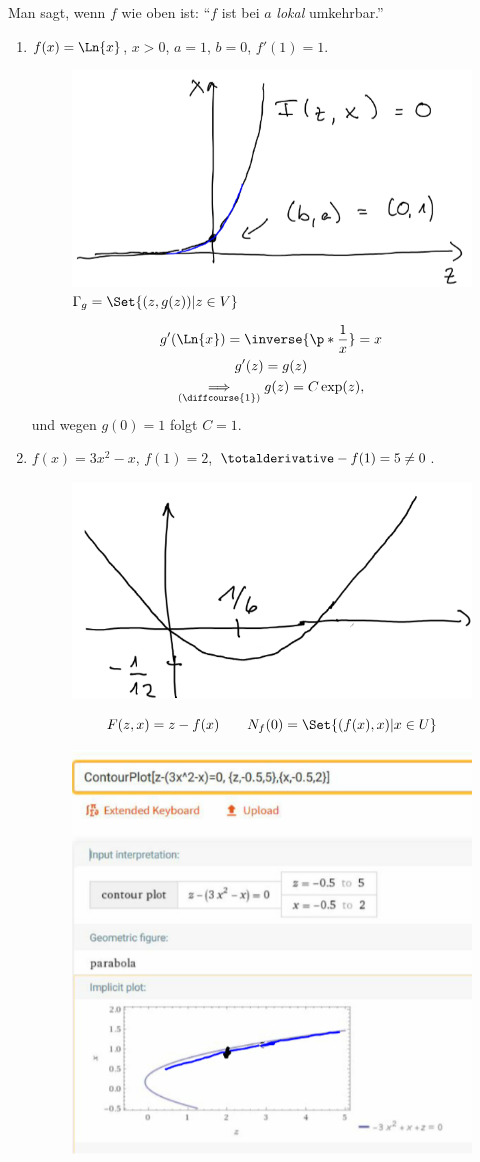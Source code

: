Man sagt, wenn \( f \) wie oben ist: \enquote{\( f \) ist bei \( a \) \emph{lokal} umkehrbar.}
\begin{beispiele}
  \begin{enumerate}
    \item \( f(x)= \Ln{x} \), \( x>0 \), \( a=1 \), \( b=0 \), \( f'(1)=1 \).
    \begin{figure}[H]
      \centering
      \includegraphics[width=0.5\linewidth]{figures/satz_von_der_umkehrungsfunktion_beispiel_ln}
      \caption*{\textcolor{Blue}{\( \Gamma_g=\Set{(z,g(z))|z\in V} \)}}
      \label{fig:satz_von_der_umkehrungsfunktion_beispiel_ln}
    \end{figure}
    \begin{gather*}
      g'(\Ln{x})=\inverse{\p*{ \frac{1}{x} }}=x\\
      g'(z)=g(z)\\
      \underset{(\text{\diffcourse{1}})}{\implies} g(z)=C\exp (z),
    \end{gather*}
    und wegen \( g(0)=1 \) folgt \( C=1 \).
    \item \( f(x)=3x^2-x \), \( f(1)=2 \), \( \totalderivative-{f}(1)=5\neq 0 \).
    \begin{figure}[H]
      \centering
      \includegraphics[width=0.5\linewidth]{figures/satz_von_der_umkehrungsfunktion_beispiel_parabel}
      \label{fig:satz_von_der_umkehrungsfunktion_beispiel_parabel}
    \end{figure}
    \begin{equation*}
      F(z,x)=z-f(x)\qquad N_f(0)=\Set{(f(x),x)|x\in U}
    \end{equation*}
    \begin{figure}[H]
      \centering
      \includegraphics[width=0.5\linewidth]{figures/satz_von_der_umkehrungsfunktion_beispiel_parabel_umkehrung}

\end{figure}
\end{enumerate}
\end{beispiele}
